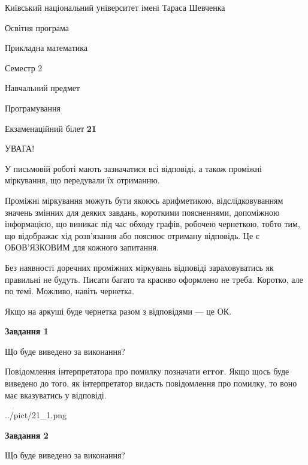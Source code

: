\documentclass[12pt, ukrainian]{article}
\begin{document}
{{\begin {small}\par
{ \center  Київський національний університет імені Тараса Шевченка \par}
{\parbox {5 cm}{Освітня програма \hfill}{\parbox {7 cm}{Прикладна математика \hfill}}\parbox {6 cm}{\hfill Семестр 2}}\par
{\parbox {5 cm} {Навчальний предмет \hfill}\parbox {7 cm}{Програмування \hfill}\parbox {6cm}{\hfill}\par}\vspace{-7pt} \end{small}}{\center Екзаменаційний білет \No \textbf
{ 21 }\par}}
{
\begin {large}
УВАГА!

У письмовій роботі мають зазначатися всі відповіді, а також проміжні міркування, що передували їх отриманню.

Проміжні міркування можуть бути якоюсь арифметикою, відслідковуванням зна\-чень змінних для деяких завдань,
короткими поясненнями, допоміжною інформацією, що виникає під час обходу графів, робочею чернеткою,
тобто тим, що відображає хід розв’язання або пояснює отриману відповідь.
Це є ОБОВ’ЯЗКОВИМ для кожного запитання.

Без наявності доречних проміжних міркувань відповіді зараховуватись як правиль\-ні не будуть.
Писати багато та красиво оформлено не треба. Коротко, але по темі. Можли\-во, навіть чернетка.

Якщо на аркуші буде чернетка разом з відповідями --- це ОК.

\newpage

{\begin {center}\textbf{Завдання 1}\end {center}}\par
Що буде виведено за виконання?

Повідомлення інтерпретатора про помилку позначати \textbf{error}.
Якщо щось буде виведено до того, як інтерпретатор видасть повідомлення про помилку, 
то воно має вказуватись у відповіді. \par


\begin{center}
	{../pict/21_1.png}
\end{center}
\newpage

{\begin {center}\textbf{Завдання 2}\end {center}}\par
Що буде виведено за виконання?


\end{large}}
\end{document}
